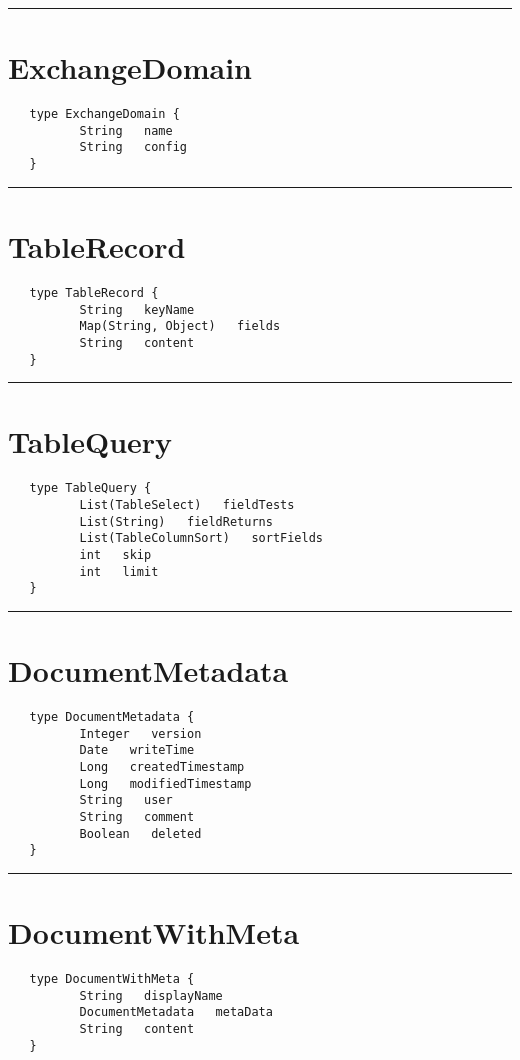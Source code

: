 \rule{15cm}{2pt}
\section{ExchangeDomain}
\label{type:ExchangeDomain}

\begin{verbatim}
   type ExchangeDomain {
          String   name
          String   config
   }
\end{verbatim}

\rule{15cm}{2pt}
\section{TableRecord}
\label{type:TableRecord}

\begin{verbatim}
   type TableRecord {
          String   keyName
          Map(String, Object)   fields
          String   content
   }
\end{verbatim}

\rule{15cm}{2pt}
\section{TableQuery}
\label{type:TableQuery}

\begin{verbatim}
   type TableQuery {
          List(TableSelect)   fieldTests
          List(String)   fieldReturns
          List(TableColumnSort)   sortFields
          int   skip
          int   limit
   }
\end{verbatim}

\rule{15cm}{2pt}
\section{DocumentMetadata}
\label{type:DocumentMetadata}

\begin{verbatim}
   type DocumentMetadata {
          Integer   version
          Date   writeTime
          Long   createdTimestamp
          Long   modifiedTimestamp
          String   user
          String   comment
          Boolean   deleted
   }
\end{verbatim}

\rule{15cm}{2pt}
\section{DocumentWithMeta}
\label{type:DocumentWithMeta}

\begin{verbatim}
   type DocumentWithMeta {
          String   displayName
          DocumentMetadata   metaData
          String   content
   }
\end{verbatim}

